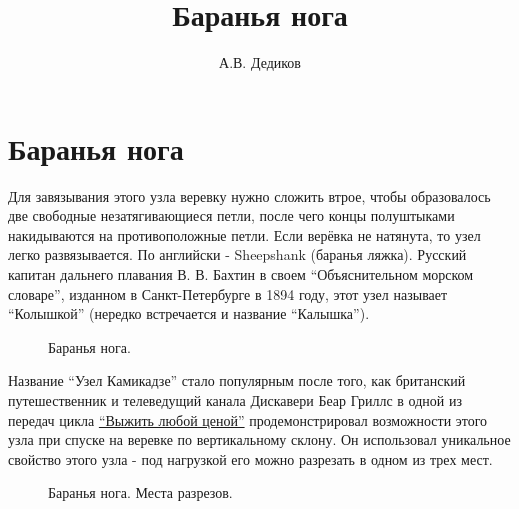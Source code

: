 \documentclass{artikel1}
\begin{document}
\title{Баранья нога}
\date{}
\author{А.В. Дедиков}

\maketitle


\section{Баранья нога}

Для завязывания этого узла веревку нужно сложить втрое, чтобы образовалось две свободные незатягивающиеся петли, после чего концы полуштыками накидываются на противоположные петли. Если верёвка не натянута, то узел легко развязывается. По английски - Sheepshank (баранья ляжка). Русский капитан дальнего плавания В. В. Бахтин в своем \enquote{Объяснительном морском словаре}, изданном в Санкт-Петербурге в 1894 году, этот узел называет \enquote{Колышкой} (нередко встречается и название \enquote{Калышка}).

\begin{figure}[H]\centering
	\begin{minipage}{1\linewidth}
		\begin{center}
			\tcbox[enhanced jigsaw,colframe=black,opacityframe=0.5,opacityback=0.5]
			{\centering{}}
		\end{center}
	\end{minipage}
\caption{Баранья нога.}
\label{ris:Sheepshank_Knot}
\end{figure}

Название \enquote{Узел Камикадзе} стало популярным после того, как британский путешественник и телеведущий канала Дискавери Беар Гриллс в одной из передач цикла \href{http://www.youtube.com/watch?v=mtgCO17QA6U||Bear}{\enquote{Выжить любой ценой}} продемонстрировал возможности этого узла при спуске на веревке по вертикальному склону. Он использовал уникальное свойство этого узла - под нагрузкой его можно разрезать в одном из трех мест.

\begin{figure}[H]\centering
	\begin{minipage}{1\linewidth}
		\begin{center}
			\tcbox[enhanced jigsaw,colframe=black,opacityframe=0.5,opacityback=0.5]
			{\centering{}}
		\end{center}
	\end{minipage}
\caption{Баранья нога. Места разрезов.}
\label{ris:Sheepshank_Knot_kut}
\end{figure}
\end{document}
